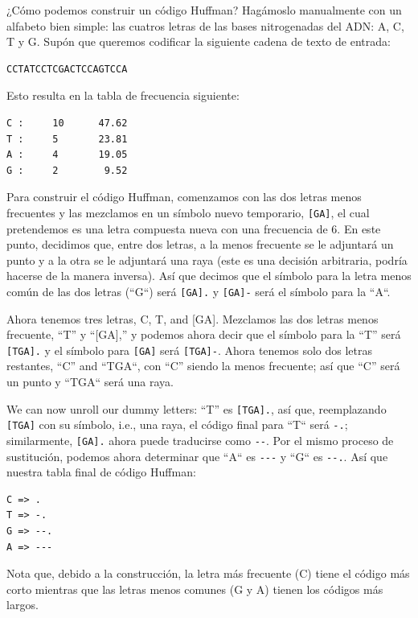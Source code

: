 ¿Cómo podemos construir un código Huffman? Hagámoslo manualmente con
un alfabeto bien simple: las cuatros letras de las bases nitrogenadas
del ADN: A, C, T y G. Supón que queremos codificar la siguiente
cadena de texto de entrada:

\begin{verbatim}
CCTATCCTCGACTCCAGTCCA
\end{verbatim}

Esto resulta en la tabla de frecuencia siguiente:

\begin{verbatim}
C :     10      47.62
T :     5       23.81
A :     4       19.05
G :     2        9.52
\end{verbatim}

Para construir el código Huffman, comenzamos con las dos letras
menos frecuentes y las mezclamos en un símbolo nuevo temporario, 
\verb|[GA]|, el cual pretendemos es una letra compuesta nueva con una
frecuencia  de 6. En este punto, decidimos que, entre dos letras,
a la menos frecuente se le adjuntará un punto y a la otra se le
adjuntará una raya (este es una decisión arbitraria, podría
hacerse de la manera inversa). Así que decimos que el símbolo 
para la letra menos común de las dos letras (``G``) será \verb|[GA].|
y \verb|[GA]-| será el símbolo para la ``A``. 

Ahora tenemos tres letras, C, T, and [GA]. Mezclamos las dos letras
menos frecuente, ``T'' y ``[GA],'' y podemos ahora decir que el
símbolo para la ``T'' será \verb|[TGA].| y el símbolo para \verb|[GA]|
será \verb|[TGA]-|. Ahora tenemos solo dos letras restantes, 
``C'' and ``TGA``, con ``C'' siendo la menos frecuente; así que 
``C'' será un punto y ``TGA`` será una raya.

We can now unroll our dummy letters: ``T'' es \verb|[TGA].|, 
así que, reemplazando \verb|[TGA]| con su símbolo, i.e., una raya,
el código final para ``T`` será \verb|-.|; similarmente, \verb|[GA].|
ahora puede traducirse como \verb|--|. Por el mismo proceso de
sustitución, podemos ahora determinar que ``A`` es \verb|---| y ``G``
es \verb|--.|. Así que nuestra tabla final de código Huffman:

\begin{verbatim}
C => .
T => -.
G => --.
A => ---
\end{verbatim}

Nota que, debido a la construcción, la letra más frecuente (C)
tiene el código más corto mientras que las letras menos
comunes (G y A) tienen los códigos más largos.

